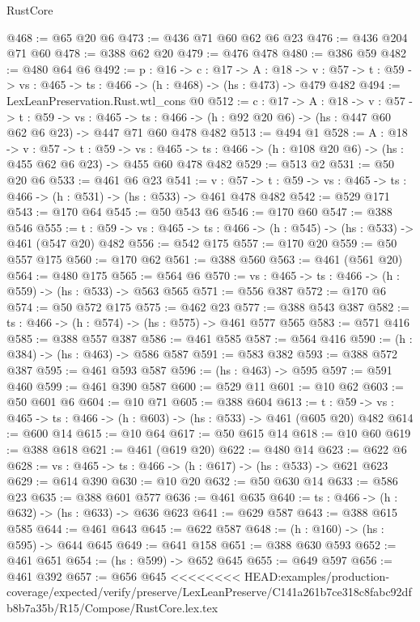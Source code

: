 \begin{lexlean}{RustCore}
\begin{coremodule}
{\begin{coremodule}
@468 := @65 @20 @6
@473 := @436 @71 @60 @62 @6 @23
@476 := @436 @204 @71 @60
@478 := @388 @62 @20
@479 := @476 @478
@480 := @386 @59
@482 := @480 @64 @6
@492 := {p : @16} ->
  {c : @17} ->
  {A : @18} ->
  {v : @57} -> {t : @59} -> {vs : @465} -> {ts : @466} -> (h : @468) -> (hs : @473) -> @479 @482
@494 := LexLeanPreservation.Rust.wtl_cons @0
@512 := {c : @17} ->
  {A : @18} ->
  {v : @57} ->
  {t : @59} ->
  {vs : @465} ->
  {ts : @466} -> (h : @92 @20 @6) -> (hs : @447 @60 @62 @6 @23) -> @447 @71 @60 @478 @482
@513 := @494 @1
@528 := {A : @18} ->
  {v : @57} ->
  {t : @59} ->
  {vs : @465} -> {ts : @466} -> (h : @108 @20 @6) -> (hs : @455 @62 @6 @23) -> @455 @60 @478 @482
@529 := @513 @2
@531 := @50 @20 @6
@533 := @461 @6 @23
@541 := {v : @57} ->
  {t : @59} -> {vs : @465} -> {ts : @466} -> (h : @531) -> (hs : @533) -> @461 @478 @482
@542 := @529 @171
@543 := @170 @64
@545 := @50 @543 @6
@546 := @170 @60
@547 := @388 @546
@555 := {t : @59} -> {vs : @465} -> {ts : @466} -> (h : @545) -> (hs : @533) -> @461 (@547 @20) @482
@556 := @542 @175
@557 := @170 @20
@559 := @50 @557 @175
@560 := @170 @62
@561 := @388 @560
@563 := @461 (@561 @20)
@564 := @480 @175
@565 := @564 @6
@570 := {vs : @465} -> {ts : @466} -> (h : @559) -> (hs : @533) -> @563 @565
@571 := @556 @387
@572 := @170 @6
@574 := @50 @572 @175
@575 := @462 @23
@577 := @388 @543 @387
@582 := {ts : @466} -> (h : @574) -> (hs : @575) -> @461 @577 @565
@583 := @571 @416
@585 := @388 @557 @387
@586 := @461 @585
@587 := @564 @416
@590 := (h : @384) -> (hs : @463) -> @586 @587
@591 := @583 @382
@593 := @388 @572 @387
@595 := @461 @593 @587
@596 := (hs : @463) -> @595
@597 := @591 @460
@599 := @461 @390 @587
@600 := @529 @11
@601 := @10 @62
@603 := @50 @601 @6
@604 := @10 @71
@605 := @388 @604
@613 := {t : @59} -> {vs : @465} -> {ts : @466} -> (h : @603) -> (hs : @533) -> @461 (@605 @20) @482
@614 := @600 @14
@615 := @10 @64
@617 := @50 @615 @14
@618 := @10 @60
@619 := @388 @618
@621 := @461 (@619 @20)
@622 := @480 @14
@623 := @622 @6
@628 := {vs : @465} -> {ts : @466} -> (h : @617) -> (hs : @533) -> @621 @623
@629 := @614 @390
@630 := @10 @20
@632 := @50 @630 @14
@633 := @586 @23
@635 := @388 @601 @577
@636 := @461 @635
@640 := {ts : @466} -> (h : @632) -> (hs : @633) -> @636 @623
@641 := @629 @587
@643 := @388 @615 @585
@644 := @461 @643
@645 := @622 @587
@648 := (h : @160) -> (hs : @595) -> @644 @645
@649 := @641 @158
@651 := @388 @630 @593
@652 := @461 @651
@654 := (hs : @599) -> @652 @645
@655 := @649 @597
@656 := @461 @392
@657 := @656 @645
<<<<<<<< HEAD:examples/production-coverage/expected/verify/preserve/LexLeanPreserve/C141a261b7ce318c8fabc92dfb8b7a35b/R15/Compose/RustCore.lex.tex

\end{coremodule}}
\end{coremodule}
\end{lexlean}
